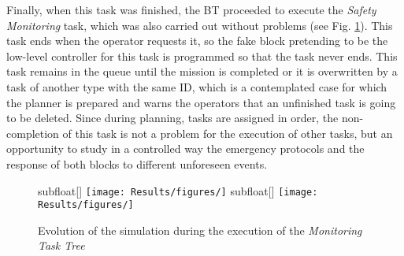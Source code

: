 Finally, when this task was finished, the \gls{BT} proceeded to execute the \emph{Safety Monitoring} task, which was also carried out without problems (see Fig. \ref{fig:Gazebo_MonitorTree}). This task ends when the operator requests it, so the fake block pretending to be the low-level controller for this task is programmed so that the task never ends. This task remains in the queue until the mission is completed or it is overwritten by a task of another type with the same \gls{ID}, which is a contemplated case for which the planner is prepared and warns the operators that an unfinished task is going to be deleted. Since during planning, tasks are assigned in order, the non-completion of this task is not a problem for the execution of other tasks, but an opportunity to study in a controlled way the emergency protocols and the response of both blocks to different unforeseen events.

\begin{figure}[htbp]
    \centering
    \hfill
    \hfill
    subfloat[]{ %
        \texttt{[image: Results/figures/]}}
        \hfill
    subfloat[]{ %
        \texttt{[image: Results/figures/]}}
    \caption{Evolution of the simulation during the execution of the \emph{Monitoring Task Tree}}
    \label{fig:Gazebo_MonitorTree}
\end{figure}



